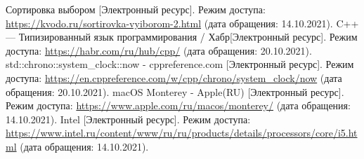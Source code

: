 \documentclass[a4paper,14pt, unknownkeysallowed]{extreport}
\begin{document}
\begin{thebibliography}{5}
	Сортировка выбором  [Электронный ресурс]. Режим доступа: \url{https://kvodo.ru/sortirovka-vyiborom-2.html} (дата обращения: 14.10.2021).
	C++ –– Типизированный язык программирования / Хабр[Электронный ресурс]. Режим доступа: \url{https://habr.com/ru/hub/cpp/} (дата обращения: 20.10.2021).
	std::chrono::system\_clock::now - cppreference.com [Электронный ресурс]. Режим доступа: \url{https://en.cppreference.com/w/cpp/chrono/system_clock/now} (дата обращения: 20.10.2021).
	macOS Monterey - Apple(RU) [Электронный ресурс]. Режим доступа: \url{https://www.apple.com/ru/macos/monterey/} (дата обращения: 14.10.2021).
	Intel [Электронный ресурс]. Режим доступа: \url{https://www.intel.ru/content/www/ru/ru/products/details/processors/core/i5.html} (дата обращения: 14.10.2021).
\end{thebibliography}

\end{document}
